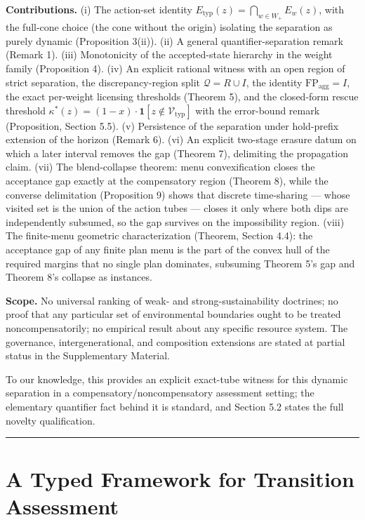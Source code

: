 \documentclass[review,11pt]{elsarticle}
\begin{document}
\textbf{Contributions.} (i) The action-set identity \(E_{\mathrm{typ}}(z) = \bigcap_{w \in W_+} E_w(z)\), with the full-cone
choice (the cone without the origin) isolating the separation as purely
dynamic (Proposition 3(ii)). (ii) A general quantifier-separation remark
(Remark 1). (iii) Monotonicity of the accepted-state hierarchy in the
weight family (Proposition 4). (iv) An explicit rational witness with an
open region of strict separation, the discrepancy-region split
\(\mathcal{Q} = R \cup I\), the identity
\(\mathrm{FP}_{\mathrm{agg}} = I\), the exact per-weight licensing thresholds (Theorem 5), and the closed-form rescue threshold \(\kappa^*(z) = (1 - x)\cdot\mathbf{1}[z \notin \mathcal{V}_{\mathrm{typ}}]\) with the error-bound remark (Proposition, Section 5.5). (v) Persistence of the separation under
hold-prefix extension of the horizon (Remark 6). (vi) An explicit
two-stage erasure datum on which a later interval removes the gap
(Theorem 7), delimiting the propagation claim. (vii) The blend-collapse
theorem: menu convexification closes the acceptance gap exactly at the compensatory region (Theorem 8), while the converse
delimitation (Proposition 9) shows that discrete time-sharing --- whose
visited set is the union of the action tubes --- closes it only where
both dips are independently subsumed, so the gap survives on the
impossibility region. (viii) The finite-menu geometric characterization
(Theorem, Section 4.4): the acceptance gap of any finite plan menu is
the part of the convex hull of the required margins that no single plan
dominates, subsuming Theorem 5's gap and Theorem 8's collapse as
instances.

\textbf{Scope.} No universal ranking of weak- and strong-sustainability doctrines; no proof that any particular set of environmental boundaries ought to be treated noncompensatorily; no empirical result about any specific resource system. The governance, intergenerational, and composition extensions are stated at partial status in the Supplementary Material.

To our knowledge, this provides an explicit exact-tube witness for this
dynamic separation in a compensatory/noncompensatory assessment setting;
the elementary quantifier fact behind it is standard, and Section 5.2
states the full novelty qualification.

\begin{center}\rule{0.5\linewidth}{0.5pt}\end{center}

\section{A Typed Framework for Transition
Assessment}\label{a-typed-framework-for-transition-assessment}
\end{document}
